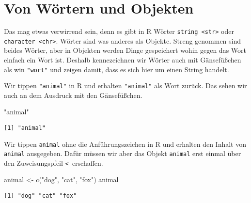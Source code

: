 \documentclass[
  letterpaper,
]{scrbook}
\newenvironment{Shaded}{\begin{snugshade}}{\end{snugshade}}
\newcommand{\FunctionTok}[1]{\textcolor[rgb]{0.28,0.35,0.67}{#1}}
\newcommand{\NormalTok}[1]{\textcolor[rgb]{0.00,0.23,0.31}{#1}}
\newcommand{\OtherTok}[1]{\textcolor[rgb]{0.00,0.23,0.31}{#1}}
\newcommand{\StringTok}[1]{\textcolor[rgb]{0.13,0.47,0.30}{#1}}
\begin{document}
\hypertarget{von-wuxf6rtern-und-objekten}{%
\section{Von Wörtern und Objekten}\label{von-wuxf6rtern-und-objekten}}

Das mag etwas verwirrend sein, denn es gibt in R Wörter
\texttt{string\ \textless{}str\textgreater{}} oder
\texttt{character\ \textless{}chr\textgreater{}}. Wörter sind was
anderes als Objekte. Streng genommen sind beides Wörter, aber in
Objekten werden Dinge gespeichert wohin gegen das Wort einfach ein Wort
ist. Deshalb kennezeichnen wir Wörter auch mit Gänsefüßchen als win
\texttt{"wort"} und zeigen damit, dass es sich hier um einen String
handelt.

Wir tippen \texttt{"animal"} in R und erhalten \texttt{"animal"} als
Wort zurück. Das sehen wir auch an dem Ausdruck mit den Gänsefüßchen.

\begin{Shaded}
\begin{Highlighting}[]
\StringTok{"animal"}
\end{Highlighting}
\end{Shaded}

\begin{verbatim}
[1] "animal"
\end{verbatim}

{}

Wir tippen \texttt{animal} ohne die Anführungszeichen in R und erhalten
den Inhalt von \texttt{animal} ausgegeben. Dafür müssen wir aber das
Objekt \texttt{animal} erst einmal über den Zuweisungspfeil
\texttt{\textless{}-}erschaffen.

\begin{Shaded}
\begin{Highlighting}[]
\NormalTok{animal }\OtherTok{\textless{}{-}} \FunctionTok{c}\NormalTok{(}\StringTok{"dog"}\NormalTok{, }\StringTok{"cat"}\NormalTok{, }\StringTok{"fox"}\NormalTok{)}
\NormalTok{animal}
\end{Highlighting}
\end{Shaded}

\begin{verbatim}
[1] "dog" "cat" "fox"
\end{verbatim}
\end{document}
